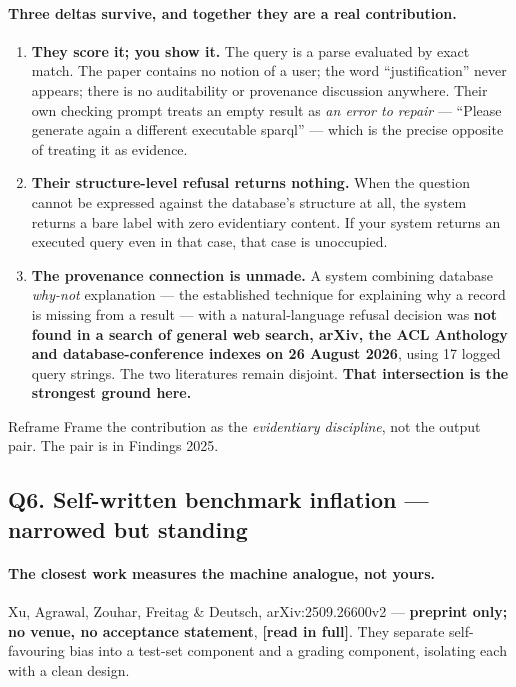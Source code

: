 \documentclass[11pt,a4paper]{article}
\newcommand{\vstanding}{\textcolor{standing}{\textbf{narrowed but standing}}}
\newcommand{\readtag}{\textcolor{standing}{\textbf{[read in full]}}}
\begin{document}
\paragraph{Three deltas survive, and together they are a real contribution.}

\begin{enumerate}
\item \textbf{They score it; you show it.} The query is a parse evaluated by exact
      match. The paper contains no notion of a user; the word ``justification''
      never appears; there is no auditability or provenance discussion anywhere.
      Their own checking prompt treats an empty result as \emph{an error to repair}
      --- ``Please generate again a different executable sparql'' --- which is the
      precise opposite of treating it as evidence.
\item \textbf{Their structure-level refusal returns nothing.} When the question
      cannot be expressed against the database's structure at all, the system
      returns a bare label with zero evidentiary content. If your system returns an
      executed query even in that case, that case is unoccupied.
\item \textbf{The provenance connection is unmade.} A system combining database
      \emph{why-not} explanation --- the established technique for explaining why a
      record is missing from a result --- with a natural-language refusal decision was
      \textbf{not found in a search of general web search, arXiv, the ACL Anthology
      and database-conference indexes on 26 August 2026}, using 17 logged query
      strings. The two literatures remain disjoint. \textbf{That intersection is the
      strongest ground here.}
\end{enumerate}

\begin{keybox}{Reframe}
Frame the contribution as the \emph{evidentiary discipline}, not the output pair.
The pair is in Findings 2025.
\end{keybox}

\subsection{Q6. Self-written benchmark inflation --- \texorpdfstring{\vstanding}{narrowed but standing}}

\paragraph{The closest work measures the machine analogue, not yours.} Xu, Agrawal,
Zouhar, Freitag \& Deutsch, arXiv:2509.26600v2 --- \textbf{preprint only; no venue,
no acceptance statement}, \readtag. They separate self-favouring bias into a
test-set component and a grading component, isolating each with a clean design.
\end{document}
